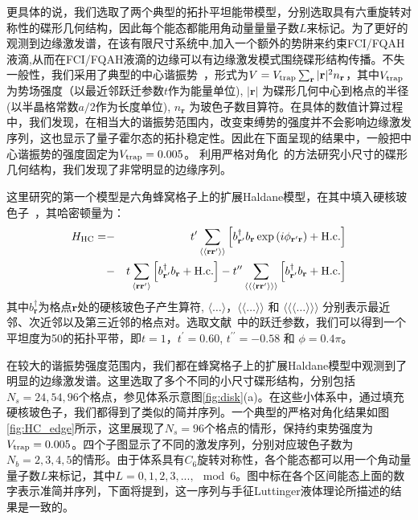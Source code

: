 更具体的说，我们选取了两个典型的拓扑平坦能带模型，分别选取具有六重旋转对称性的碟形几何结构，因此每个能态都能用角动量量量子数$L$来标记。为了更好的观测到边缘激发谱，在该有限尺寸系统中,加入一个额外的势阱来约束FCI/FQAH液滴,从而在FCI/FQAH液滴的边缘可以有边缘激发模式围绕碟形结构传播。不失一般性，我们采用了典型的中心谐振势~\cite{Kjall2012}，形式为$V = V_{\rm trap}\sum_{\mathbf{r}} |\mathbf{r}|^2 n_{\mathbf{r}}$，其中$V_{\rm trap}$ 为势场强度（以最近邻跃迁参数$t$作为能量单位), $|{\mathbf{r}}|$ 为碟形几何中心到格点的半径(以半晶格常数$a/2$作为长度单位),  $n_{\mathbf{r}}$ 为玻色子数目算符。在具体的数值计算过程中，我们发现，在相当大的谐振势范围内，改变束缚势的强度并不会影响边缘激发序列，这也显示了量子霍尔态的拓扑稳定性。因此在下面呈现的结果中，一般把中心谐振势的强度固定为$V_{\rm trap}=0.005$。
利用严格对角化~\cite{Lin1993}的方法研究小尺寸的碟形几何结构，我们发现了非常明显的边缘序列。

这里研究的第一个模型是六角蜂窝格子上的扩展Haldane模型，在其中填入硬核玻色子~\cite{Wang2011}，其哈密顿量为：
\begin{eqnarray}
H_{\rm HC}= &-&t^{\prime}\sum_{\langle\langle\mathbf{r}\mathbf{r}^{
\prime}\rangle\rangle}
\left[b^{\dagger}_{\mathbf{r}^{ \prime}}b_{\mathbf{r}}\exp\left(i\phi_{\mathbf{r}^{ \prime}\mathbf{r}}\right)+\textrm{H.c.}\right]\\
&-&t\sum_{\langle\mathbf{r}\mathbf{r}^{ \prime}\rangle}
\left[b^{\dagger}_{\mathbf{r}^{\prime}}b_{\mathbf{r}}+\textrm{H.c.}\right]
-t^{\prime\prime}\sum_{\langle\langle\langle\mathbf{r}\mathbf{r}^{
\prime}\rangle\rangle\rangle}
\left[b^{\dagger}_{\mathbf{r}^{\prime}}b_{\mathbf{r}}+\textrm{H.c.}\right]\nonumber
\label{eq:HC}
\end{eqnarray}
其中$b^{\dagger}_{\mathbf{r}}$为格点$\mathbf{r}$处的硬核玻色子产生算符,  $\langle\dots\rangle$，$\langle\langle\dots\rangle\rangle$ 和 $\langle\langle\langle\dots\rangle\rangle\rangle$ 分别表示最近邻、次近邻以及第三近邻的格点对。选取文献~\cite{Wang2011}中的跃迁参数，我们可以得到一个平坦度为50的拓扑平带，即$t=1$，$t^{\prime}=0.60$, $t^{\prime\prime}=-0.58$ 和 $\phi=0.4\pi$。

在较大的谐振势强度范围内，我们都在蜂窝格子上的扩展Haldane模型中观测到了明显的边缘激发谱。这里选取了多个不同的小尺寸碟形结构，分别包括 $N_s = 24, 54, 96$个格点，参见体系示意图\ref{fig:disk}(a)。在这些小体系中，通过填充硬核玻色子，我们都得到了类似的简并序列。一个典型的严格对角化结果如图\ref{fig:HC_edge}所示，这里展现了$N_s=96$个格点的情形，保持约束势强度为$V_{\rm trap}=0.005$。四个子图显示了不同的激发序列，分别对应玻色子数为$N_b = 2,3,4,5$的情形。由于体系具有$C_6$旋转对称性，各个能态都可以用一个角动量量子数$L$来标记，其中$L = 0, 1, 2, 3,..., \mod 6$。图中标在各个区间能态上面的数字表示准简并序列，下面将提到，这一序列与手征Luttinger液体理论所描述的结果是一致的。

